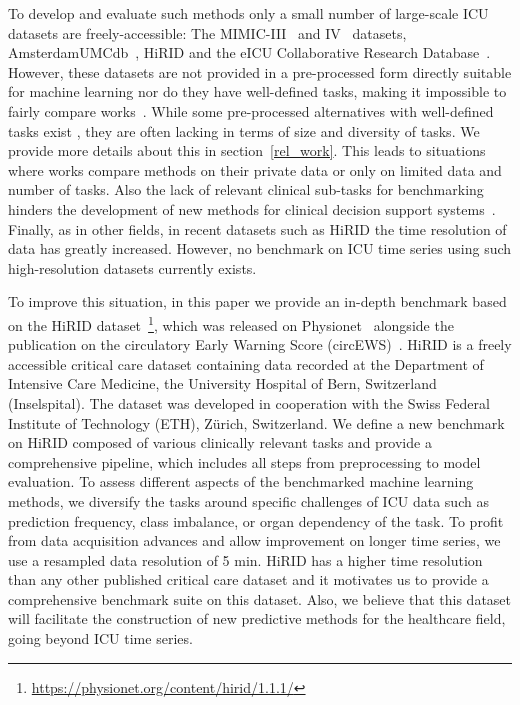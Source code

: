 \documentclass{article}
\begin{document}
To develop and evaluate such methods only a small number of large-scale ICU datasets are freely-accessible: The MIMIC-III~\cite{johnson2016mimic} and IV~\cite{MIMIC-IV} datasets, AmsterdamUMCdb~\cite{ams}, HiRID \citep{hirid} and the eICU Collaborative Research Database~\cite{pollard2018eicu}. However, these datasets are not provided in a pre-processed form directly suitable for machine learning nor do they have well-defined tasks, making it impossible to fairly compare works~\cite{johnson2017reproducibility}. While some pre-processed alternatives with well-defined tasks exist \citep{goldberger2000physiobank, reyna2019early}, they are often lacking in terms of size and diversity of tasks. We provide more details about this in section~\ref{rel_work}. This leads to situations where works compare methods on their private data \citep{tomavsev2019clinically} or only on limited data and number of tasks. Also the lack of relevant clinical sub-tasks for benchmarking hinders the development of new methods for clinical decision support systems~\cite{harutyunyan2019multitask}. Finally, as in other fields, in recent datasets such as HiRID \citep{hirid} the time resolution of data has greatly increased. However, no benchmark on ICU time series using such high-resolution datasets currently exists.

To improve this situation, in this paper we provide an in-depth benchmark based on the HiRID dataset~\citep{hirid, hyland2020early}\footnote{\url{https://physionet.org/content/hirid/1.1.1/}}, which was released on Physionet~\cite{hirid} alongside the publication on the circulatory Early Warning Score (circEWS)~\cite{hyland2020early}. HiRID is a freely accessible critical care dataset containing data recorded at the Department of Intensive Care Medicine, the University Hospital of Bern, Switzerland (Inselspital). The dataset was developed in cooperation with the Swiss Federal Institute of Technology (ETH), Zürich, Switzerland. We define a new benchmark on HiRID composed of various clinically relevant tasks and provide a comprehensive pipeline, which includes all steps from preprocessing to model evaluation. To assess different aspects of the benchmarked machine learning methods, we diversify the tasks around specific challenges of ICU data such as prediction frequency, class imbalance, or organ dependency of the task. To profit from data acquisition advances and allow improvement on longer time series, we use a resampled data resolution of 5 min. HiRID has a higher time resolution than any other published critical care dataset and it motivates us to provide a comprehensive benchmark suite on this dataset. Also, we believe that this dataset will facilitate the construction of new predictive methods for the healthcare field, going beyond ICU time series.
\end{document}
